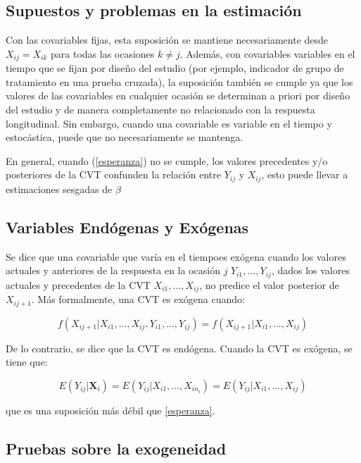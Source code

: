 \documentclass[12pt]{article}
\def\cvt{covariable que varía en el tiempo}
\def\xseqj{$X_{i1}, ..., X_{ij}$}
\def\yseqj{$Y_{i1}, ..., Y_{ij}$}
\begin{document}
\subsection{Supuestos y problemas en la estimación}

Con las covariables fijas, esta suposición se mantiene necesariamente desde $X_{ij} = X_{ik}$ para todas las ocasiones 
$k \neq j$. Además, con covariables variables en el tiempo que se fijan por diseño del estudio (por ejemplo, indicador 
de grupo de tratamiento en una prueba cruzada), la suposición también se cumple ya que los valores de las covariables 
en cualquier ocasión se determinan a priori por diseño del estudio y de manera completamente no relacionado con la 
respuesta longitudinal. Sin embargo, cuando una covariable es variable en el tiempo y estocástica, puede que no 
necesariamente se mantenga.

En general, cuando (\ref{esperanza}) no se cumple, los valores precedentes y/o posteriores de la CVT confunden la 
relación entre $Y_{ij}$ y $X_{ij}$, esto puede llevar a estimaciones sesgadas de $\beta$

\subsection{Variables Endógenas y Exógenas}

Se dice que una \cvt es exógena cuando los valores actuales y anteriores de la respuesta en la ocasión 
$j$ \yseqj, dados los valores actuales y precedentes de la CVT \xseqj, no predice el valor 
posterior de $X_{ij+1}$. Más formalmente, una CVT es exógena cuando:

\begin{equation}
\label{exogeneidad}
	f(X_{ij+1}|X_{i1}, ..., X_{ij}, Y_{i1}, ..., Y_{ij}) = f(X_{ij+1}|X_{i1}, ..., X_{ij})
\end{equation}

De lo contrario, se dice que la CVT es endógena. Cuando la CVT es exógena, se tiene que:

\begin{equation}
\label{exogeneidad_debil}
	E(Y_{ij}|\bm{X}_i) = E(Y_{ij}|X_{i1}, ..., X_{in_i}) = E(Y_{ij}|X_{i1}, ..., X_{ij})
\end{equation}

que es una suposición más débil que \ref{esperanza}.

\subsection{Pruebas sobre la exogeneidad}
\end{document}
